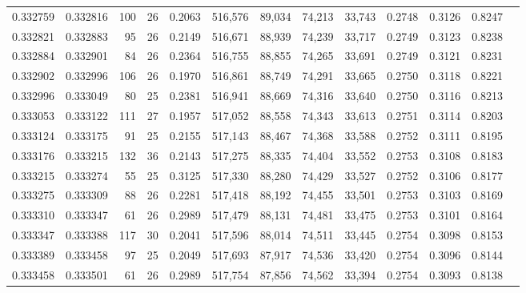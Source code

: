 \begin{tabular}{rrrrrrrrrrrrr}
0.332759 & 0.332816 &   100 &  26 &                                     0.2063 & 516,576 &  89,034 &  74,213 &  33,743 & 0.2748 & 0.3126 & 0.8247 \\
0.332821 & 0.332883 &    95 &  26 &                                     0.2149 & 516,671 &  88,939 &  74,239 &  33,717 & 0.2749 & 0.3123 & 0.8238 \\
0.332884 & 0.332901 &    84 &  26 &                                     0.2364 & 516,755 &  88,855 &  74,265 &  33,691 & 0.2749 & 0.3121 & 0.8231 \\
0.332902 & 0.332996 &   106 &  26 &                                     0.1970 & 516,861 &  88,749 &  74,291 &  33,665 & 0.2750 & 0.3118 & 0.8221 \\
0.332996 & 0.333049 &    80 &  25 &                                     0.2381 & 516,941 &  88,669 &  74,316 &  33,640 & 0.2750 & 0.3116 & 0.8213 \\
0.333053 & 0.333122 &   111 &  27 &                                     0.1957 & 517,052 &  88,558 &  74,343 &  33,613 & 0.2751 & 0.3114 & 0.8203 \\
0.333124 & 0.333175 &    91 &  25 &                                     0.2155 & 517,143 &  88,467 &  74,368 &  33,588 & 0.2752 & 0.3111 & 0.8195 \\
0.333176 & 0.333215 &   132 &  36 &                                     0.2143 & 517,275 &  88,335 &  74,404 &  33,552 & 0.2753 & 0.3108 & 0.8183 \\
0.333215 & 0.333274 &    55 &  25 &                                     0.3125 & 517,330 &  88,280 &  74,429 &  33,527 & 0.2752 & 0.3106 & 0.8177 \\
0.333275 & 0.333309 &    88 &  26 &                                     0.2281 & 517,418 &  88,192 &  74,455 &  33,501 & 0.2753 & 0.3103 & 0.8169 \\
0.333310 & 0.333347 &    61 &  26 &                                     0.2989 & 517,479 &  88,131 &  74,481 &  33,475 & 0.2753 & 0.3101 & 0.8164 \\
0.333347 & 0.333388 &   117 &  30 &                                     0.2041 & 517,596 &  88,014 &  74,511 &  33,445 & 0.2754 & 0.3098 & 0.8153 \\
0.333389 & 0.333458 &    97 &  25 &                                     0.2049 & 517,693 &  87,917 &  74,536 &  33,420 & 0.2754 & 0.3096 & 0.8144 \\
0.333458 & 0.333501 &    61 &  26 &                                     0.2989 & 517,754 &  87,856 &  74,562 &  33,394 & 0.2754 & 0.3093 & 0.8138 \\

\end{tabular}
